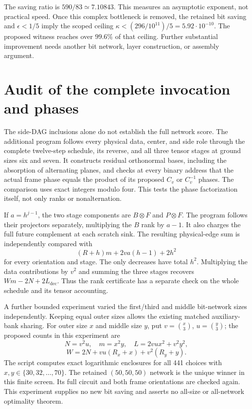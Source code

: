 \documentclass[11pt]{article}
\begin{document}
The saving ratio is $590/83\simeq7.10843$. This measures an asymptotic exponent,
not practical speed. Once this complex bottleneck is removed, the retained
bit saving and $\epsilon<1/5$ imply the scoped ceiling
$\kappa<(296/10^{11})/5=5.92\cdot10^{-10}$. The proposed witness reaches
over $99.6\%$ of that ceiling. Further substantial improvement needs another
bit network, layer construction, or assembly argument.

\section{Audit of the complete invocation and phases}
The side-DAG inclusions alone do not establish the full network score. The
additional program  follows every physical data, center, and
side role through the complete twelve-step schedule, its reverse, and all
three tensor stages at ground sizes six and seven. It constructs residual
orthonormal bases, including the absorption of alternating planes, and checks
at every binary address that the actual frame phase equals the product of
its proposed $C_v$ or $C_v^{-1}$ phases. The comparison uses exact integers
modulo four. This tests the phase factorization itself, not only ranks or
nonalternation.

If $a=h^{j-1}$, the two stage components are $B\otimes F$ and $P\otimes F$.
The program follows their projectors separately, multiplying the $B$ rank
by $a-1$. It also charges the full future complement at each scratch sink.
The resulting physical-edge sum is independently compared with
\[
 (R+h)m+2va(h-1)+2h^2
\]
for every orientation and stage. The only decreases have total $h^2$.
Multiplying the data contributions by $v^2$ and summing the three stages
recovers $Wm-2N+2L_{\mathrm{dec}}$. Thus the rank certificate has a separate
check on the whole schedule and its tensor accounting.

A further bounded experiment varied the first/third and middle bit-network
sizes independently. Keeping equal outer sizes allows the existing matched
auxiliary-bank sharing. For outer size $x$ and middle size $y$, put
$v=\binom{x}3$, $u=\binom{y}3$; the proposed counts in this experiment are
\[
 N=v^2u,\quad m=x^2y,\quad
 L=2vux^2+v^2y^2,
\]
\[
 W=2N+vu(R_x+x)+v^2(R_y+y).
\]
The script  computes exact logarithmic enclosures for
all 441 choices with $x,y\in\{30,32,\ldots,70\}$. The retained $(50,50,50)$
network is the unique winner in this finite screen. Its full circuit and both
frame orientations are checked again. This experiment supplies no new bit
saving and asserts no all-size or all-network optimality theorem.
\end{document}
